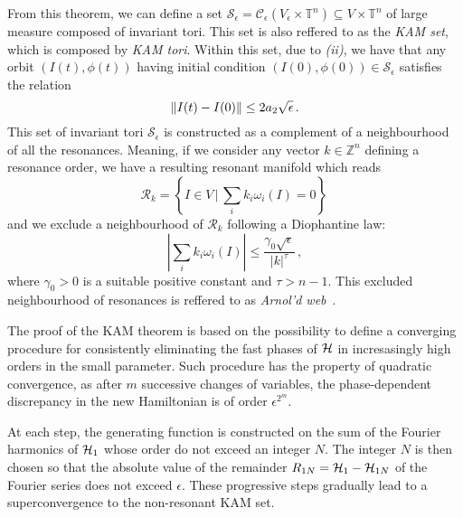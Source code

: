 From this theorem, we can define a set $\mathcal{S}_\epsilon = \mathcal{C}_\epsilon(V_\epsilon \times \mathbb{T}^n) \subseteq V \times \mathbb{T}^n$ of large measure composed of invariant tori. This set is also reffered to as the \textit{KAM set}, which is composed by \textit{KAM tori}. Within this set, due to \textit{(ii)}, we have that any orbit $(I(t), \phi(t))$ having initial condition $(I(0), \phi(0)) \in \mathcal{S}_\epsilon$ satisfies the relation
\begin{equation}
    \norm{I(t) - I(0)} \leq 2 a_2 \sqrt{\epsilon} \,.
\end{equation}
This set of invariant tori $\mathcal{S}_\epsilon$ is constructed as a complement of a neighbourhood of all the resonances. Meaning, if we consider any vector $k\in \mathbb{Z}^n$ defining a resonance order, we have a resulting resonant manifold which reads
\begin{equation}
    \mathcal{R}_k = \left\{I\in V \, \big| \, \sum_i k_i \omega_i(I) = 0\right\} \,
\end{equation}  
and we exclude a neighbourhood of $\mathcal{R}_k$ following a Diophantine law:
\begin{equation}
    \left|\sum_i k_i \omega_i(I)\right| \leq \frac{\gamma_0 \sqrt{\epsilon}}{|k|^\tau} \,,
\end{equation}
where $\gamma_0 > 0$ is a suitable positive constant and $\tau > n-1$. This excluded neighbourhood of resonances is reffered to as \textit{Arnol'd web}~\cite{}.

The proof of the KAM theorem is based on the possibility to define a converging procedure for consistently eliminating the fast phases of $\mathcal{H}$ in incresasingly high orders in the small parameter. Such procedure has the property of quadratic convergence, as after $m$ successive changes of variables, the phase-dependent discrepancy in the new Hamiltonian is of order $\epsilon^{2^m}$.

At each step, the generating function is constructed on the sum of the Fourier harmonics of $\mathcal{H}_1$ whose order do not exceed an integer $N$. The integer $N$ is then chosen so that the absolute value of the remainder $R_{1N} = \mathcal{H}_1 - \mathcal{H}_{1N}$ of the Fourier series does not exceed $\epsilon$. These progressive steps gradually lead to a superconvergence to the non-resonant KAM set.

